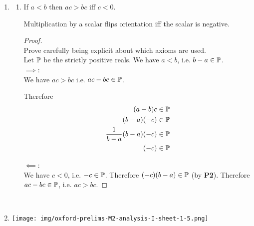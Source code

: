 \begin{enumerate}
\begin{enumerate}[label=(\alph*)]
\begin{proof}
\begin{align*}
        \Big((-b) + (0 + b)\Big) + (-(a + b))            &= (-a) + (-b) ~~~~~~~ \text{definition of negative}\\
        \Big((-b) + b\Big) + (-(a + b))                &= (-a) + (-b) ~~~~~~~ \text{definition of 0}\\
        0 + (-(a + b))                         &= (-a) + (-b) ~~~~~~~ \text{definition of negative}\\
        -(a + b)                               &= (-a) + (-b) ~~~~~~~ \text{definition of 0}\\
      \end{align*}
    \end{proof}
  \end{enumerate}

\item
  \begin{enumerate}[label=(\alph*)]
  \item
    \newpage
    \begin{theorem*}
      If $a < b$ then $ac > bc$ iff $c < 0$.
    \end{theorem*}
    \begin{intuition*}
      Multiplication by a scalar flips orientation iff the scalar is negative.
    \end{intuition*}
    \begin{proof}~\\
       Prove carefully being explicit about which axioms are used.\\
      Let $\P$ be the strictly positive reals. We have $a < b$, i.e. $b - a \in \P$.\\
      $\implies$:\\
      We have $ac > bc$ i.e. $ac - bc \in \P$.

      Therefore
      \begin{align*}
        (a - b)c &\in \P\\
        (b - a)(-c) &\in \P\\
        \frac{1}{b-a}(b - a)(-c) &\in \P\\
        (-c) &\in \P
      \end{align*}

      $\impliedby$:\\
      We have $c < 0$, i.e. $-c \in \P$. Therefore $(-c)(b - a) \in \P$ (by {\bf P2}). Therefore
      $ac - bc \in \P$, i.e. $ac > bc$.
    \end{proof}
  \end{enumerate}~\\
\item

  \begin{mdframed}
    \texttt{[image: img/oxford-prelims-M2-analysis-I-sheet-1-5.png]}
  \end{mdframed}
\end{enumerate}

